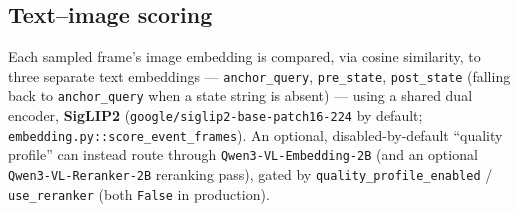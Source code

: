 \documentclass[11pt]{article}
\newcommand{\code}[1]{\texttt{\small #1}}
\newcommand{\file}[1]{\texttt{\footnotesize #1}}
\begin{document}
\subsection{Text--image scoring}
Each sampled frame's image embedding is compared, via cosine similarity, to
three separate text embeddings --- \code{anchor\_query}, \code{pre\_state},
\code{post\_state} (falling back to \code{anchor\_query} when a state string
is absent) --- using a shared dual encoder, \textbf{SigLIP2}
(\code{google/siglip2-base-patch16-224} by default;
\file{embedding.py::score\_event\_frames}). An optional, disabled-by-default
``quality profile'' can instead route through \code{Qwen3-VL-Embedding-2B}
(and an optional \code{Qwen3-VL-Reranker-2B} reranking pass), gated by
\code{quality\_profile\_enabled} / \code{use\_reranker} (both \code{False} in
production).
\end{document}
